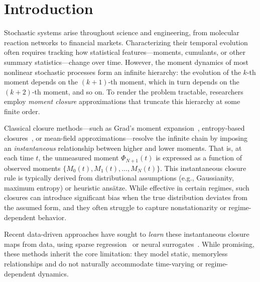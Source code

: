 \documentclass[journal, onecolumn]{IEEEtran}
\begin{document}
%
\IEEEpeerreviewmaketitle

\section{Introduction}

Stochastic systems arise throughout science and engineering, from molecular reaction networks to financial markets. Characterizing their temporal evolution often requires tracking how statistical features---moments, cumulants, or other summary statistics---change over time. However, the moment dynamics of most nonlinear stochastic processes form an infinite hierarchy: the evolution of the $k$-th moment depends on the $(k+1)$-th moment, which in turn depends on the $(k+2)$-th moment, and so on. To render the problem tractable, researchers employ \emph{moment closure} approximations that truncate this hierarchy at some finite order.

Classical closure methods---such as Grad's moment expansion~\cite{grad1949kinetic}, entropy-based closures~\cite{levermore1996moment}, or mean-field approximations---resolve the infinite chain by imposing an \emph{instantaneous} relationship between higher and lower moments. That is, at each time $t$, the unmeasured moment $\Phi_{N+1}(t)$ is expressed as a function of observed moments $\{M_0(t), M_1(t), \dots, M_N(t)\}$. This instantaneous closure rule is typically derived from distributional assumptions (e.g., Gaussianity, maximum entropy) or heuristic ansätze. While effective in certain regimes, such closures can introduce significant bias when the true distribution deviates from the assumed form, and they often struggle to capture nonstationarity or regime-dependent behavior.

Recent data-driven approaches have sought to \emph{learn} these instantaneous closure maps from data, using sparse regression~\cite{brunton2016discovering,donaghy2023symbolic,yang2024identification} or neural surrogates~\cite{huang2022mlRTE1,huang2023mlRTE2,ling2016reynolds}. While promising, these methods inherit the core limitation: they model static, memoryless relationships and do not naturally accommodate time-varying or regime-dependent dynamics.
\end{document}
